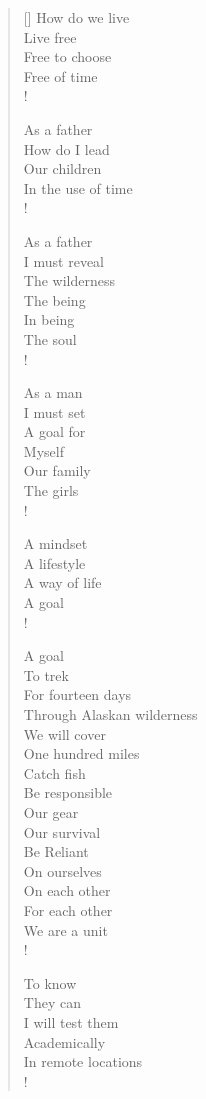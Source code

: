 \documentclass[11pt, a4paper]{article}
\begin{document}
\begin{verse}[\versewidth]
How do we live \\
Live free \\
Free to choose \\
Free of time \\!

As a father \\ 
How do I lead \\
Our children \\
In the use of time \\!

As a father \\
I must reveal \\
The wilderness \\
The being \\
In being \\
The soul \\!

As a man \\
I must set \\
A goal for \\
Myself \\
Our family \\
The girls \\!

A mindset \\
A lifestyle \\
A way of life \\
A goal \\!

A goal \\
To trek  \\
For fourteen days \\ 
Through Alaskan wilderness \\
We will cover \\
One hundred miles \\
Catch fish \\
Be responsible \\ 
Our gear \\
Our survival \\
Be Reliant \\
On ourselves \\
On each other \\
For each other \\
We are a unit \\!

To know  \\
They can \\
I will test them \\
Academically \\
In remote locations \\!


\end{verse}
\end{document}
